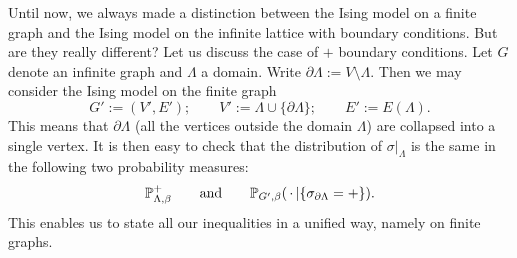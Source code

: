 \begin{remark}
    Until now, we always made a distinction between the Ising model on a finite graph
    and the Ising model on the infinite lattice with boundary conditions.
    But are they really different?
    Let us discuss the case of $+$ boundary conditions.
    Let $G$ denote an infinite graph and $\Lambda$ a domain.
    Write $\partial\Lambda:=V\setminus\Lambda$.
    Then we may consider the Ising model on the finite graph
    \[
        G':=(V',E');
        \qquad
        V':=\Lambda\cup \{\partial\Lambda\};
        \qquad
        E':=E(\Lambda).
    \]
    This means that $\partial\Lambda$ (all the vertices outside the domain $\Lambda$) are collapsed
    into a single vertex.
    It is then easy to check that
    the distribution of $\sigma|_{\Lambda}$ is the same in the following two probability measures:
    \[
        \P^+_{\Lambda,\beta}
        \qquad
        \text{and}
        \qquad
        \P_{G',\beta}(\blank|\{\sigma_{\partial\Lambda}=+\}).
    \]
    This enables us to state all our inequalities in a unified way,
    namely on finite graphs.
\end{remark}
